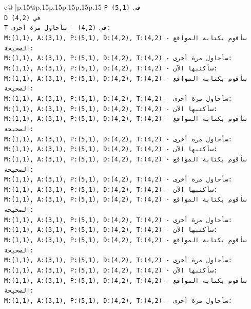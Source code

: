 \documentclass{article}
\begin{document}
{\begin{supertabular}{c@{$\;$}|p{.15\linewidth}@{}p{.15\linewidth}p{.15\linewidth}p{.15\linewidth}p{.15\linewidth}p{.15\linewidth}}
{{{\texttt{P في (5,1)} \\
\texttt{D في (4,2)} \\
\texttt{T في (4,2) {-} سأحاول مرة أخرى:} \\
\texttt{M:(1,1), A:(3,1), P:(5,1), D:(4,2), T:(4,2) {-} سأقوم بكتابة المواقع الصحيحة:} \\
\texttt{M:(1,1), A:(3,1), P:(5,1), D:(4,2), T:(4,2) {-} سأحاول مرة أخرى:} \\
\texttt{M:(1,1), A:(3,1), P:(5,1), D:(4,2), T:(4,2) {-} سأكتبها الآن:} \\
\texttt{M:(1,1), A:(3,1), P:(5,1), D:(4,2), T:(4,2) {-} سأقوم بكتابة المواقع الصحيحة:} \\
\texttt{M:(1,1), A:(3,1), P:(5,1), D:(4,2), T:(4,2) {-} سأحاول مرة أخرى:} \\
\texttt{M:(1,1), A:(3,1), P:(5,1), D:(4,2), T:(4,2) {-} سأكتبها الآن:} \\
\texttt{M:(1,1), A:(3,1), P:(5,1), D:(4,2), T:(4,2) {-} سأقوم بكتابة المواقع الصحيحة:} \\
\texttt{M:(1,1), A:(3,1), P:(5,1), D:(4,2), T:(4,2) {-} سأحاول مرة أخرى:} \\
\texttt{M:(1,1), A:(3,1), P:(5,1), D:(4,2), T:(4,2) {-} سأكتبها الآن:} \\
\texttt{M:(1,1), A:(3,1), P:(5,1), D:(4,2), T:(4,2) {-} سأقوم بكتابة المواقع الصحيحة:} \\
\texttt{M:(1,1), A:(3,1), P:(5,1), D:(4,2), T:(4,2) {-} سأحاول مرة أخرى:} \\
\texttt{M:(1,1), A:(3,1), P:(5,1), D:(4,2), T:(4,2) {-} سأكتبها الآن:} \\
\texttt{M:(1,1), A:(3,1), P:(5,1), D:(4,2), T:(4,2) {-} سأقوم بكتابة المواقع الصحيحة:} \\
\texttt{M:(1,1), A:(3,1), P:(5,1), D:(4,2), T:(4,2) {-} سأحاول مرة أخرى:} \\
\texttt{M:(1,1), A:(3,1), P:(5,1), D:(4,2), T:(4,2) {-} سأكتبها الآن:} \\
\texttt{M:(1,1), A:(3,1), P:(5,1), D:(4,2), T:(4,2) {-} سأقوم بكتابة المواقع الصحيحة:} \\
\texttt{M:(1,1), A:(3,1), P:(5,1), D:(4,2), T:(4,2) {-} سأحاول مرة أخرى:} \\
\texttt{M:(1,1), A:(3,1), P:(5,1), D:(4,2), T:(4,2) {-} سأكتبها الآن:} \\
\texttt{M:(1,1), A:(3,1), P:(5,1), D:(4,2), T:(4,2) {-} سأقوم بكتابة المواقع الصحيحة:} \\
\texttt{M:(1,1), A:(3,1), P:(5,1), D:(4,2), T:(4,2) {-} سأحاول مرة أخرى:} \\
}}}
\end{supertabular}}
\end{document}
